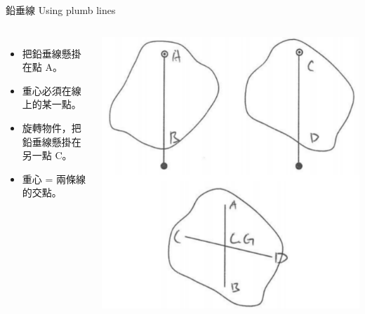 \documentclass[beamer=true]{standalone}
\begin{document}
\begin{frame}{鉛垂線 Using plumb lines}
    \begin{columns}
        \begin{itemize}
            \item 把鉛垂線懸掛在點 A。
            \item 重心必須在線上的某一點。
            \item 旋轉物件，把鉛垂線懸掛在另一點 C。
            \item 重心 = 兩條線的交點。
        \end{itemize}



        {\par\centering
            \includegraphics[width=\textwidth]{assets/85f02607.png}
            \par}
    \end{columns}
\end{frame}
\end{document}
